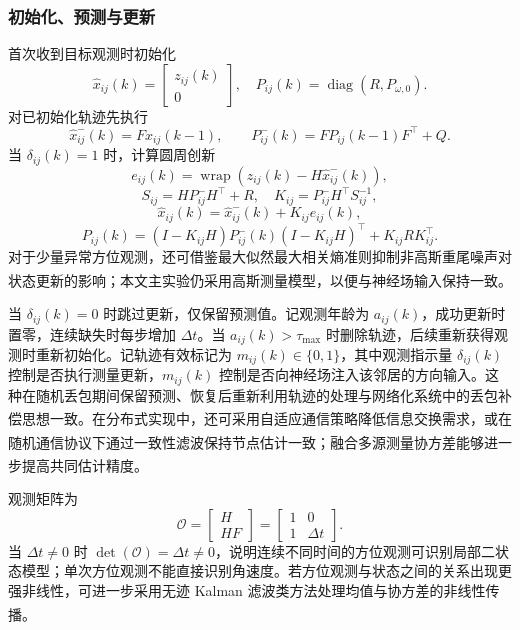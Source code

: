 \documentclass[UTF8,fontset=windows,11pt]{ctexart}
\newcommand{\upcite}[1]{\textsuperscript{\cite{#1}}}
\begin{document}
\subsubsection{初始化、预测与更新}
首次收到目标观测时初始化
\begin{equation}
 \hat x_{ij}(k)=\begin{bmatrix}z_{ij}(k)\\0\end{bmatrix},
 \quad P_{ij}(k)=\operatorname{diag}(R,P_{\omega,0}).
\end{equation}
对已初始化轨迹先执行
\begin{equation}
 \hat x^-_{ij}(k)=F\hat x_{ij}(k-1),\qquad
 P^-_{ij}(k)=FP_{ij}(k-1)F^\top+Q.
\end{equation}
当 $\delta_{ij}(k)=1$ 时，计算圆周创新
\begin{equation}
 e_{ij}(k)=\operatorname{wrap}\left(z_{ij}(k)-H\hat x^-_{ij}(k)\right),
\end{equation}
\begin{equation}
 S_{ij}=HP^-_{ij}H^\top+R,\quad K_{ij}=P^-_{ij}H^\top S_{ij}^{-1},
\end{equation}
\begin{equation}
 \hat x_{ij}(k)=\hat x^-_{ij}(k)+K_{ij}e_{ij}(k),
\end{equation}
\begin{equation}
 P_{ij}(k)=(I-K_{ij}H)P^-_{ij}(k)(I-K_{ij}H)^\top+K_{ij}RK_{ij}^\top.
\end{equation}
对于少量异常方位观测，还可借鉴最大似然最大相关熵准则抑制非高斯重尾噪声对状态更新的影响\upcite{ZhangBearing2025}；本文主实验仍采用高斯测量模型，以便与神经场输入保持一致。

当 $\delta_{ij}(k)=0$ 时跳过更新，仅保留预测值。记观测年龄为 $a_{ij}(k)$，成功更新时置零，连续缺失时每步增加 $\Delta t$。当 $a_{ij}(k)>\tau_{\max}$ 时删除轨迹，后续重新获得观测时重新初始化。记轨迹有效标记为 $m_{ij}(k)\in\{0,1\}$，其中观测指示量 $\delta_{ij}(k)$ 控制是否执行测量更新，$m_{ij}(k)$ 控制是否向神经场注入该邻居的方向输入。这种在随机丢包期间保留预测、恢复后重新利用轨迹的处理与网络化系统中的丢包补偿思想一致\upcite{Yu2024}。在分布式实现中，还可采用自适应通信策略降低信息交换需求\upcite{Selvi2025}，或在随机通信协议下通过一致性滤波保持节点估计一致\upcite{Zhou2025}；融合多源测量协方差能够进一步提高共同估计精度\upcite{Yang2025}。

观测矩阵为
\begin{equation}
 \mathcal O=\begin{bmatrix}H\\HF\end{bmatrix}=\begin{bmatrix}1&0\\1&\Delta t\end{bmatrix}.
\end{equation}
当 $\Delta t\ne0$ 时 $\det(\mathcal O)=\Delta t\ne0$，说明连续不同时间的方位观测可识别局部二状态模型；单次方位观测不能直接识别角速度。若方位观测与状态之间的关系出现更强非线性，可进一步采用无迹 Kalman 滤波类方法处理均值与协方差的非线性传播\upcite{Rong2024}。
\end{document}
